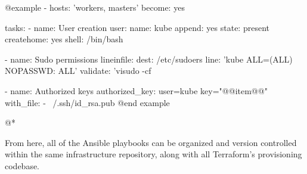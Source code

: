 @example
- hosts: 'workers, masters'
  become: yes

  tasks:
    - name: User creation
      user:
        name: kube
        append: yes
        state: present
        createhome: yes
        shell: /bin/bash
    
    - name: Sudo permissions
      lineinfile:
        dest: /etc/sudoers
        line: 'kube ALL=(ALL) NOPASSWD: ALL'
        validate: 'visudo -cf %
    
    - name: Authorized keys
      authorized_key: user=kube key="@{@{item@}@}"
      with_file:
        - ~/.ssh/id_rsa.pub
@end example

@*

From here, all of the Ansible playbooks can be organized and version controlled within the same infrastructure repository, along with all Terraform's provisioning codebase.
